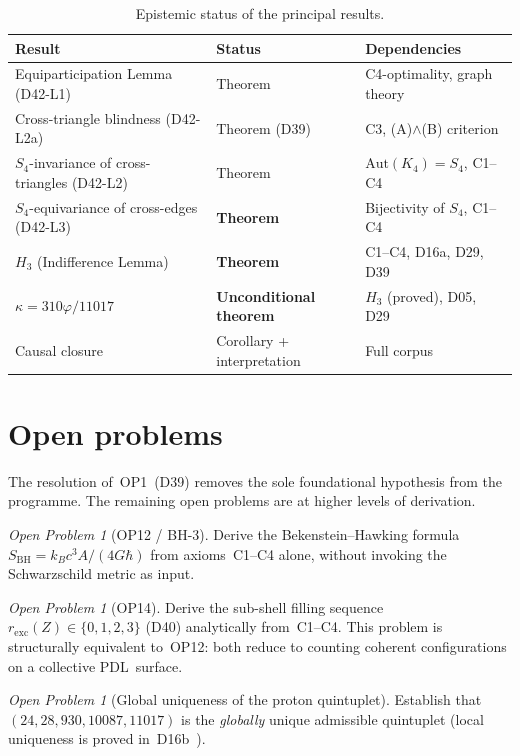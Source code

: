 \documentclass[11pt,a4paper]{article}
\theoremstyle{plain}
\theoremstyle{definition}
\theoremstyle{remark}
\newtheorem{openproblem}[theorem]{Open Problem}
\newcommand{\PDL}{\textnormal{PDL}}
\newcommand{\vp}{\varphi}
\newcommand{\kap}{\kappa}
\begin{document}
\begin{table}[H]
\centering
\caption{Epistemic status of the principal results.}
\label{tab:status}
\begin{tabular}{lll}
\toprule
Result & Status & Dependencies \\
\midrule
Equiparticipation Lemma (D42-L1) & Theorem & C4-optimality, graph theory \\
Cross-triangle blindness (D42-L2a) & Theorem (D39) & C3, (A)$\wedge$(B) criterion \\
$S_4$-invariance of cross-triangles (D42-L2) & Theorem & $\mathrm{Aut}(K_4)=S_4$, C1--C4 \\
$S_4$-equivariance of cross-edges (D42-L3) & \textbf{Theorem} & Bijectivity of $S_4$, C1--C4 \\
$H_3$ (Indifference Lemma) & \textbf{Theorem} & C1--C4, D16a, D29, D39 \\
$\kap = 310\vp/11017$ & \textbf{Unconditional theorem} & $H_3$ (proved), D05, D29 \\
Causal closure & Corollary + interpretation & Full corpus \\
\bottomrule
\end{tabular}
\end{table}

\section{Open problems}
\label{sec:open}

The resolution of~OP1~(D39) removes the sole foundational hypothesis from the programme. The remaining open problems are at higher levels of derivation.

\begin{openproblem}[OP12 / BH-3]
Derive the Bekenstein--Hawking formula $S_{\mathrm{BH}} = k_B c^3 A / (4G\hbar)$ from axioms~C1--C4 alone, without invoking the Schwarzschild metric as input.
\end{openproblem}

\begin{openproblem}[OP14]
Derive the sub-shell filling sequence $r_{\mathrm{exc}}(Z) \in \{0,1,2,3\}$ (D40) analytically from~C1--C4. This problem is structurally equivalent to~OP12: both reduce to counting coherent configurations on a collective \PDL\ surface.
\end{openproblem}

\begin{openproblem}[Global uniqueness of the proton quintuplet]
Establish that $(24, 28, 930, 10087, 11017)$ is the \emph{globally} unique admissible quintuplet (local uniqueness is proved in~D16b~\cite{PDL_D16b_2026}).
\end{openproblem}



\end{document}
